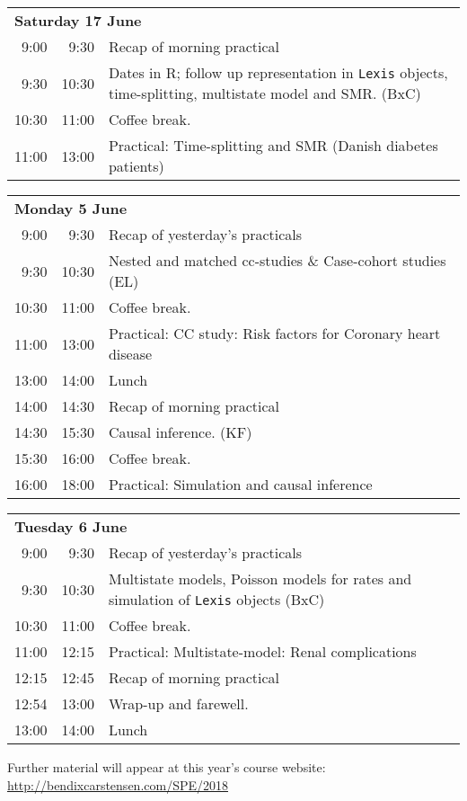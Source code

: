 \noindent
\begin{tabular}{r@{ -- }rp{13cm}}
\multicolumn{3}{l}{\bf Saturday 17 June} \\
 9:00 &  9:30 & Recap of morning practical \\
 9:30 & 10:30 & Dates in R; follow up representation in \texttt{Lexis} objects,
                time-splitting, multistate model and SMR. (BxC)\\
10:30 & 11:00 & Coffee break. \\
11:00 & 13:00 & Practical: Time-splitting and SMR (Danish diabetes patients)\\[1em]
\end{tabular}

\noindent
\begin{tabular}{r@{ -- }rp{13cm}}
 \multicolumn{3}{l}{\bf Monday 5 June} \\
 9:00 &  9:30 & Recap of yesterday's practicals \\
 9:30 & 10:30 & Nested and matched cc-studies \& Case-cohort studies (EL) \\
10:30 & 11:00 & Coffee break. \\
11:00 & 13:00 & Practical: CC study: Risk factors for Coronary heart disease\\
13:00 & 14:00 & Lunch \\
14:00 & 14:30 & Recap of morning practical \\
14:30 & 15:30 & Causal inference. (KF)\\
15:30 & 16:00 & Coffee break. \\
16:00 & 18:00 & Practical: Simulation and causal inference\\
\end{tabular}

\noindent
\begin{tabular}{r@{ -- }rp{13cm}}
\multicolumn{3}{l}{\bf Tuesday 6 June} \\
 9:00 &  9:30 & Recap of yesterday's practicals \\
 9:30 & 10:30 & Multistate models, Poisson models for rates and
                simulation of \texttt{Lexis} objects (BxC)\\
10:30 & 11:00 & Coffee break. \\
11:00 & 12:15 & Practical: Multistate-model: Renal complications\\
12:15 & 12:45 & Recap of morning practical \\
12:54 & 13:00 & Wrap-up and farewell.\\
13:00 & 14:00 & Lunch \\
\end{tabular}
\vfill
\noindent
Further material will appear at this year's course website:\\ 
\url{http://bendixcarstensen.com/SPE/2018}

